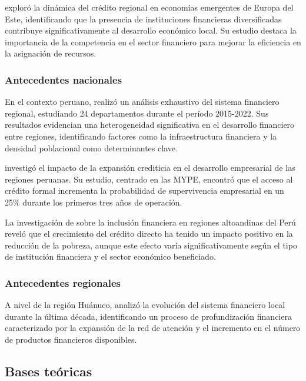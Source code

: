 \documentclass[12pt, a4paper]{article}
\begin{document}
\textcite{Smith2022} exploró la dinámica del crédito regional en economías emergentes de Europa del Este, identificando que la presencia de instituciones financieras diversificadas contribuye significativamente al desarrollo económico local. Su estudio destaca la importancia de la competencia en el sector financiero para mejorar la eficiencia en la asignación de recursos.

\subsubsection{Antecedentes nacionales}
En el contexto peruano, \textcite{Vasquez2023} realizó un análisis exhaustivo del sistema financiero regional, estudiando 24 departamentos durante el período 2015-2022. Sus resultados evidencian una heterogeneidad significativa en el desarrollo financiero entre regiones, identificando factores como la infraestructura financiera y la densidad poblacional como determinantes clave.

\textcite{Mendoza2022} investigó el impacto de la expansión crediticia en el desarrollo empresarial de las regiones peruanas. Su estudio, centrado en las MYPE, encontró que el acceso al crédito formal incrementa la probabilidad de supervivencia empresarial en un 25\% durante los primeros tres años de operación.

La investigación de \textcite{Torres2024} sobre la inclusión financiera en regiones altoandinas del Perú reveló que el crecimiento del crédito directo ha tenido un impacto positivo en la reducción de la pobreza, aunque este efecto varía significativamente según el tipo de institución financiera y el sector económico beneficiado.

\subsubsection{Antecedentes regionales}
A nivel de la región Huánuco, \textcite{Ramirez2023} analizó la evolución del sistema financiero local durante la última década, identificando un proceso de profundización financiera caracterizado por la expansión de la red de atención y el incremento en el número de productos financieros disponibles.

\subsection{Bases teóricas}
\end{document}
